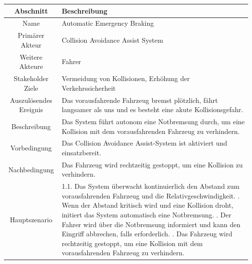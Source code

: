 \begin{table}[H]
	\centering
	\begin{tabular}{| c | p{11cm} |}
		\hline
		\textbf{Abschnitt} & \textbf{Beschreibung}\\
		\hline
		Name & Automatic Emergency Braking\\
		\hline
		Primärer Akteur & Collision Avoidance Assist System\\
		\hline
		Weitere Akteure & Fahrer\\
		\hline
		Stakeholder Ziele & Vermeidung von Kollisionen, Erhöhung der Verkehrssicherheit\\
		\hline
		Auszulösendes Ereignis & Das vorausfahrende Fahrzeug bremst plötzlich, fährt langsamer als uns und es besteht eine akute Kollisionsgefahr.\\
		\hline
		Beschreibung & Das System führt autonom eine Notbremsung durch, um eine Kollision mit dem vorausfahrenden Fahrzeug zu verhindern.\\
		\hline
		Vorbedingung & Das Collision Avoidance Assist-System ist aktiviert und einsatzbereit.\\
		\hline
		Nachbedingung & Das Fahrzeug wird rechtzeitig gestoppt, um eine Kollision zu verhindern.\\
		\hline
		Hauptszenario & 1.1. Das System überwacht kontinuierlich den Abstand zum vorausfahrenden Fahrzeug und die Relativgeschwindigkeit. \newline
		1.2. Wenn der Abstand kritisch wird und eine Kollision droht, initiert das System automatisch eine Notbremsung. \newline
		1.3. Der Fahrer wird über die Notbremsung informiert und kann den Eingriff abbrechen, falls erforderlich. \newline
		1.4. Das Fahrzeug wird rechtzeitig gestoppt, um eine Kollision mit dem vorausfahrenden Fahrzeug zu verhindern.\\
		\hline
	\end{tabular}
\end{table}
